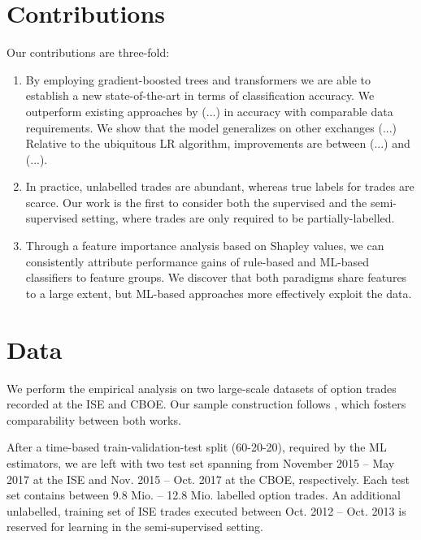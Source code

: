 \section{Contributions}

Our contributions are three-fold: 
\begin{enumerate}[label=(\roman*),noitemsep]

\item By employing gradient-boosted trees and transformers we are able to establish a new state-of-the-art in terms of classification accuracy. We outperform existing approaches by (...) in accuracy with comparable data requirements. We show that the model generalizes on other exchanges (...) Relative to the ubiquitous \gls{LR} algorithm, improvements are between (...) and (...).
\item In practice, unlabelled trades are abundant, whereas true labels for trades are scarce. Our work is the first to consider both the supervised and the semi-supervised setting, where trades are only required to be partially-labelled.
\item Through a feature importance analysis based on Shapley values, we can consistently attribute performance gains of rule-based and \gls{ML}-based classifiers to feature groups. We discover that both paradigms share features to a large extent, but \gls{ML}-based approaches more effectively exploit the data.
\end{enumerate}

\section{Data}


We perform the empirical analysis on two large-scale datasets of option trades recorded at the \gls{ISE} and \gls{CBOE}. Our sample construction follows \textcite[][]{grauerOptionTradeClassification2022}, which fosters comparability between both works. 

After a time-based train-validation-test split (60-20-20), required by the \gls{ML} estimators, we are left with two test set spanning from November 2015 -- May 2017 at the \gls{ISE} and Nov. 2015 -- Oct. 2017 at the \gls{CBOE}, respectively. Each test set contains between 9.8 Mio. --  12.8 Mio. labelled option trades. An additional unlabelled, training set of \gls{ISE} trades executed between Oct. 2012 -- Oct. 2013 is reserved for learning in the semi-supervised setting.

